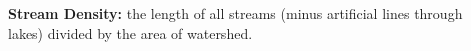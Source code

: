 \documentclass[bigger]{beamer}
\begin{document}
\begin{frame}
\begin{center}

  \begin{columns}[b]  
    \begin{column}{0.4\textwidth}
      \huge{\textbf{Stream Density:} the length of all streams (minus artificial lines through lakes) divided by the area of watershed.}
    \end{column}

    \begin{column}{0.25\textwidth}
\end{column}
\end{columns}
\end{center}
\end{frame}
\end{document}
